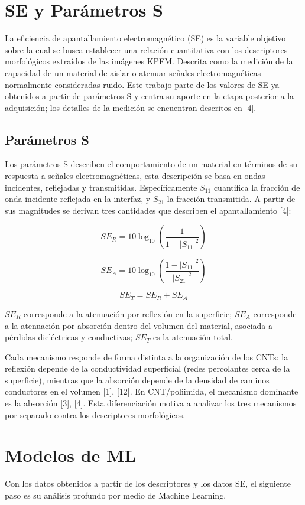 \section{SE y Parámetros S}
La eficiencia de apantallamiento electromagnético (SE) es la variable objetivo sobre la cual se busca establecer una relación cuantitativa con los descriptores morfológicos extraídos de las imágenes KPFM. Descrita como la medición de la capacidad de un material de aislar o atenuar señales electromagnéticas normalmente consideradas ruido. 
Este trabajo parte de los valores de SE ya obtenidos a partir de parámetros S y centra su aporte en la etapa posterior a la adquisición; los detalles de la medición se encuentran descritos en [4].

\subsection{Parámetros S}
Los parámetros S describen el comportamiento de un material en términos de su respuesta a señales electromagnéticas, esta descripción se basa en ondas incidentes, reflejadas y transmitidas. Específicamente $S_{11}$ cuantifica la fracción de onda incidente reflejada en la interfaz, y $S_{21}$ la fracción transmitida. A partir de sus magnitudes se derivan tres cantidades que describen el apantallamiento [4]:

    $$SE_R = 10 \log_{10}\left(\frac{1}{1 - |S_{11}|^2}\right)$$

$$SE_A = 10 \log_{10}\left(\frac{1 - |S_{11}|^2}{|S_{21}|^2}\right)$$

$$SE_T = SE_R + SE_A$$

$SE_R$ corresponde a la atenuación por reflexión en la superficie; $SE_A$ corresponde a la atenuación por absorción dentro del volumen del material,
asociada a pérdidas dieléctricas y conductivas; $SE_T$ es la
atenuación total.

Cada mecanismo responde de forma distinta a la organización de
los CNTs: la reflexión depende de la conductividad superficial
(redes percolantes cerca de la superficie), mientras que la
absorción depende de la densidad de caminos conductores en el
volumen [1], [12]. En CNT/poliimida, el mecanismo dominante es la absorción [3], [4]. Esta diferenciación motiva a analizar los tres mecanismos por separado contra los descriptores morfológicos.


\section{Modelos de ML}
Con los datos obtenidos a partir de los descriptores y los datos SE, el siguiente paso es su análisis profundo por medio de Machine Learning. 

